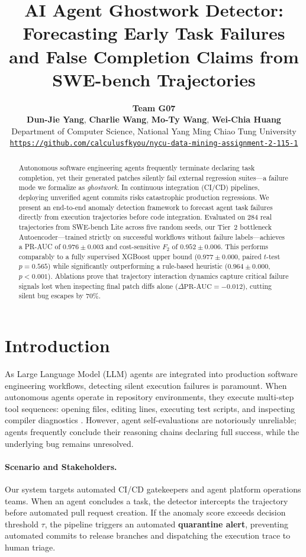 \documentclass[11pt]{article}
\title{\textbf{AI Agent Ghostwork Detector: Forecasting Early Task Failures and False Completion Claims from SWE-bench Trajectories}}
\author{
  \textbf{Team G07} \\
  \textbf{Dun-Jie Yang}, \textbf{Charlie Wang}, \textbf{Mo-Ty Wang}, \textbf{Wei-Chia Huang} \\
  Department of Computer Science, National Yang Ming Chiao Tung University \\
  \texttt{\url{https://github.com/calculusfkyou/nycu-data-mining-assignment-2-115-1}}
}
\begin{document}
\maketitle

\begin{abstract}
Autonomous software engineering agents frequently terminate declaring task completion, yet their generated patches silently fail external regression suites---a failure mode we formalize as \textit{ghostwork}. In continuous integration (CI/CD) pipelines, deploying unverified agent commits risks catastrophic production regressions. We present an end-to-end anomaly detection framework to forecast agent task failures directly from execution trajectories before code integration. Evaluated on 284 real trajectories from SWE-bench Lite across five random seeds, our Tier~2 bottleneck Autoencoder---trained strictly on successful workflows without failure labels---achieves a PR-AUC of $0.976 \pm 0.003$ and cost-sensitive $F_2$ of $0.952 \pm 0.006$. This performs comparably to a fully supervised XGBoost upper bound ($0.977 \pm 0.000$, paired $t$-test $p=0.565$) while significantly outperforming a rule-based heuristic ($0.964 \pm 0.000$, $p<0.001$). Ablations prove that trajectory interaction dynamics capture critical failure signals lost when inspecting final patch diffs alone ($\Delta\text{PR-AUC} = -0.012$), cutting silent bug escapes by 70\%.
\end{abstract}

\section{Introduction}
As Large Language Model (LLM) agents are integrated into production software engineering workflows, detecting silent execution failures is paramount. When autonomous agents operate in repository environments, they execute multi-step tool sequences: opening files, editing lines, executing test scripts, and inspecting compiler diagnostics \citep{yang2024sweagent}. However, agent self-evaluations are notoriously unreliable; agents frequently conclude their reasoning chains declaring full success, while the underlying bug remains unresolved.

\paragraph{Scenario and Stakeholders.}
Our system targets automated CI/CD gatekeepers and agent platform operations teams. When an agent concludes a task, the detector intercepts the trajectory before automated pull request creation. If the anomaly score exceeds decision threshold $\tau$, the pipeline triggers an automated \textbf{quarantine alert}, preventing automated commits to release branches and dispatching the execution trace to human triage.
\end{document}
